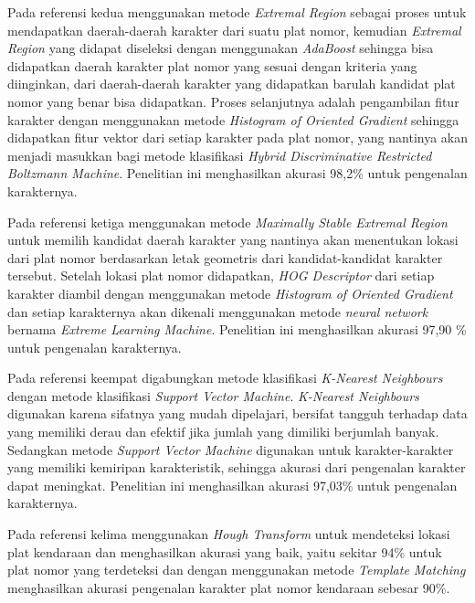 \noindent Pada referensi kedua \cite{gou2016} menggunakan metode \textit{Extremal Region} sebagai proses untuk mendapatkan daerah-daerah karakter dari suatu plat nomor, kemudian \textit{Extremal Region} yang didapat diseleksi dengan menggunakan \textit{AdaBoost} sehingga bisa didapatkan daerah karakter plat nomor yang sesuai dengan kriteria yang diinginkan, dari daerah-daerah karakter yang didapatkan barulah kandidat plat nomor yang benar bisa didapatkan. Proses selanjutnya adalah pengambilan fitur karakter dengan menggunakan metode \textit{Histogram of Oriented Gradient} sehingga didapatkan fitur vektor dari setiap karakter pada plat nomor, yang nantinya akan menjadi masukkan bagi metode klasifikasi \textit{Hybrid Discriminative Restricted Boltzmann Machine}. Penelitian ini menghasilkan akurasi 98,2\% untuk pengenalan karakternya.

\noindent Pada referensi ketiga \cite{gou2014} menggunakan metode \textit{Maximally Stable Extremal Region} untuk memilih kandidat daerah karakter yang nantinya akan menentukan lokasi dari plat nomor berdasarkan letak geometris dari kandidat-kandidat karakter tersebut. Setelah lokasi plat nomor didapatkan, \textit{HOG Descriptor} dari setiap karakter diambil dengan menggunakan metode \textit{Histogram of Oriented Gradient} dan setiap karakternya akan dikenali menggunakan metode \textit{neural network} bernama \textit{Extreme Learning Machine}. Penelitian ini menghasilkan akurasi 97,90 \% untuk pengenalan karakternya.

\noindent Pada referensi keempat \cite{tabrizi} digabungkan metode klasifikasi \textit{K-Nearest Neighbours} dengan metode klasifikasi \textit{Support Vector Machine}. \textit{K-Nearest Neighbours} digunakan karena sifatnya yang mudah dipelajari, bersifat tangguh terhadap data yang memiliki derau dan efektif jika jumlah yang dimiliki berjumlah banyak. Sedangkan metode \textit{Support Vector Machine} digunakan untuk karakter-karakter yang memiliki kemiripan karakteristik, sehingga akurasi dari pengenalan karakter dapat meningkat. Penelitian ini menghasilkan akurasi 97,03\% untuk pengenalan karakternya.

\noindent Pada referensi kelima \cite{rasheed} menggunakan \textit{Hough Transform} untuk mendeteksi lokasi plat kendaraan dan menghasilkan akurasi yang baik, yaitu sekitar 94\% untuk plat nomor yang terdeteksi dan dengan menggunakan metode \textit{Template Matching} menghasilkan akurasi pengenalan karakter plat nomor kendaraan sebesar 90\%.\\

